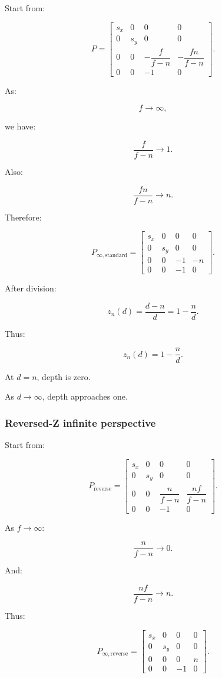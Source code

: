 Start from:

\[
 P= \begin{bmatrix} s_x&0&0&0\\ 0&s_y&0&0\\ 0&0&-\dfrac f{f-n}&-\dfrac{fn}{f-n}\\ 0&0&-1&0 \end{bmatrix}.
\]

As:

\[
 f\to\infty,
\]

we have:

\[
 \frac f{f-n}\to1.
\]

Also:

\[
 \frac{fn}{f-n}\to n.
\]

Therefore:

\[
 \boxed{ P_{\infty,\mathrm{standard}}= \begin{bmatrix} s_x&0&0&0\\ 0&s_y&0&0\\ 0&0&-1&-n\\ 0&0&-1&0 \end{bmatrix} }.
\]

After division:

\[
 z_n(d)= \frac{d-n}{d} = 1-\frac nd.
\]

Thus:

\[
 \boxed{ z_n(d)=1-\frac nd }.
\]

At \(d=n\), depth is zero.

As \(d\to\infty\), depth approaches one.

\subsubsection{Reversed-Z infinite perspective}\label{reversed-z-infinite-perspective}

Start from:

\[
 P_{\mathrm{reverse}}= \begin{bmatrix} s_x&0&0&0\\ 0&s_y&0&0\\ 0&0&\dfrac n{f-n}&\dfrac{nf}{f-n}\\ 0&0&-1&0 \end{bmatrix}.
\]

As \(f\to\infty\):

\[
 \frac n{f-n}\to0.
\]

And:

\[
 \frac{nf}{f-n}\to n.
\]

Thus:

\[
 \boxed{ P_{\infty,\mathrm{reverse}}= \begin{bmatrix} s_x&0&0&0\\ 0&s_y&0&0\\ 0&0&0&n\\ 0&0&-1&0 \end{bmatrix} }.
\]

